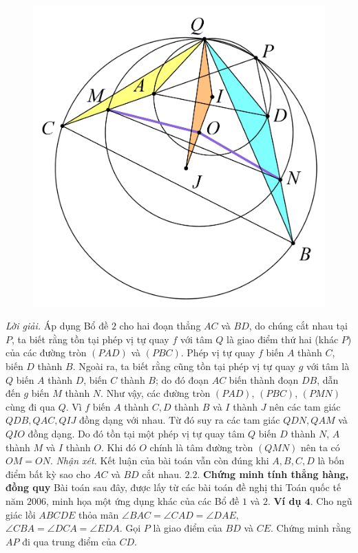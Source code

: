 \begin{multicols}{2}
\begin{figure}[H]
		\includegraphics[width= 0.9\linewidth]{7}
		\vspace*{-10pt}
	\end{figure}
	\textit{Lời giải.} Áp dụng Bổ đề $2$ cho hai đoạn thẳng $AC$ và $BD$, do chúng cắt nhau tại $P$, ta biết rằng tồn tại phép vị tự quay $f$ với tâm $Q$ là giao điểm thứ hai (khác $P$) của các đường tròn $(PAD)$ và $(PBC)$. Phép vị tự quay $f$ biến $A$ thành $C$, biến $D$ thành $B$. Ngoài ra, ta biết rằng cũng tồn tại phép vị tự quay $g$ với tâm là $Q$ biến $A$ thành $D$, biến $C$ thành $B$; do đó đoạn $AC$  biến thành đoạn $DB$, dẫn đến $g$ biến $M$ thành $N$. Như vậy, các đường tròn $(PAD)$, $(PBC)$, $(PMN)$ cùng đi qua $Q$. Vì $f$ biến $A$ thành $C,D$ thành $B$ và $I$ thành $J$ nên các tam giác $QDB,QAC,QIJ$ đồng dạng với nhau. Từ đó suy ra các tam giác $QDN,QAM$ và $QIO$ đồng dạng. Do đó tồn tại một phép vị tự quay tâm $Q$ biến $D$ thành $N$, $A$ thành $M$ và $I$ thành $O$. Khi đó $O$ chính là tâm đường tròn $(QMN)$ nên ta có $OM=ON$.
	\vskip 0.1cm
	\textit{Nhận xét.} Kết luận của bài toán vẫn còn đúng khi $A,B,C,D$ là bốn điểm bất kỳ sao cho $AC$ và $BD$ cắt nhau. 
	\vskip 0.1cm
	$\pmb{2.2.}$ \textbf{\color{hoccungpi}Chứng minh tính thẳng hàng, đồng quy}
	\vskip 0.1cm
	Bài toán sau đây, được lấy từ các bài toán đề nghị thi Toán quốc tế năm $2006$, minh họa một ứng dụng khác của các Bổ đề $1$ và $2$.
	\vskip 0.1cm
	\textbf{\color{hoccungpi}Ví dụ $\pmb{4.}$} Cho ngũ giác lồi $ABCDE$ thỏa mãn $\angle BAC = \angle CAD = \angle DAE,$ $\angle CBA = \angle DCA =\angle EDA$. Gọi $P$ là giao điểm của $BD$ và $CE$. Chứng minh rằng $AP$ đi qua trung điểm của $CD$. 

\end{multicols}
